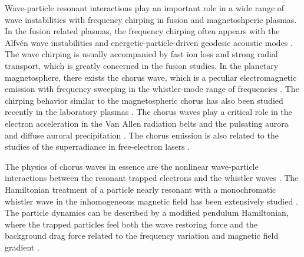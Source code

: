 Wave-particle resonant interactions play an important role  in a wide range of wave instabilities
with frequency chirping in fusion and magnetoshperic plasmas.
In the fusion related plasmas, the frequency chirping often appears with the Alfv\'en wave instabilities \cite{chen2016,wang2018,wang2012,wang2012a} and energetic-particle-driven geodesic acoustic modes \cite{wang2013}.
The wave chirping is usually accompanied by fast ion loss and strong radial transport, which is greatly concerned in the fusion studies.
In the planetary magnetosphere, there exists the chorus wave, which is a peculiar electromagnetic emission with frequency sweeping in the whistler-mode range of frequencies \cite{helliwell1965whistlers,burtis_magnetospheric_1976,tsurutani_postmidnight_1974}. 
The chirping behavior similar to the magnetospheric chorus has also been studied recently in the laboratory plasmas \cite{vancompernolle2015,saitoh2024}.
The chorus waves  play a critical role in the electron acceleration   in the Van Allen radiation belts \cite{horne_wave_2005,thorne_rapid_2013,reeves_electron_2013} and the pulsating aurora  and diffuse auroral precipitation \cite{nishimura_identifying_2010,kasahara_pulsating_2018,thorne_scattering_2010}.
The chorus emission is also related to 
 the studies of the superradiance in free-electron lasers \cite{zonca_nonlinear_2021, soto-chavez2012}.

The physics of chorus waves in essence are the nonlinear wave-particle interactions 
 between the resonant trapped electrons and the whistler waves \cite{omura_theory_2008, an2019}.
The Hamiltonian treatment of a particle nearly resonant with a monochromatic whistler wave in the inhomogeneous magnetic field has been extensively studied \cite{albert1993,albert2021}.
The particle dynamics can be described by a modified pendulum Hamiltonian, where the trapped particles feel both the wave restoring force and the background drag force related to the frequency variation and magnetic field gradient \cite{zheng2024,tao_trap-release-amplify_2021}.

